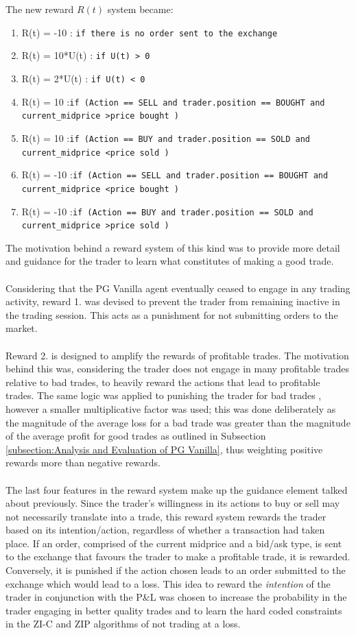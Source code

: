 \documentclass[ %
                    author={Ashwinder Khurana},
                supervisor={Prof Dave Cliff},
                    degree={MEng},
                     title={The Deeply Reinforced Trader},
                  subtitle={},
                      type={enterprise},
                      year={2020} ]{dissertation}
\begin{document}
{The new reward $R(t)$ system became: 
\begin{enumerate}
\item R(t) = -10 : \texttt{if there is no order sent to the exchange}
\item R(t) = 10*U(t) : \texttt{if U(t) > 0}
\item R(t) = 2*U(t) : \texttt{if U(t) < 0}
\item R(t) = 10 :\texttt{if (Action == SELL and trader.position == BOUGHT and current\_midprice \textgreater  price bought )}
\item R(t) = 10 :\texttt{if (Action == BUY and trader.position == SOLD and current\_midprice \textless  price sold )}
\item R(t) = -10 :\texttt{if (Action == SELL and trader.position == BOUGHT and current\_midprice \textless  price bought )}
\item R(t) = -10 :\texttt{if (Action == BUY and trader.position == SOLD and current\_midprice \textgreater  price sold )}
\end{enumerate}
\noindent
The motivation behind a reward system of this kind was to provide more detail and guidance for the trader to learn what constitutes of making a good trade. 
\\
\\
Considering that the PG Vanilla agent eventually ceased to engage in any trading activity, reward 1. was devised to prevent the trader from remaining inactive in the trading session. This acts as a punishment for not submitting orders to the market. 
\\
\\
Reward 2. is designed to amplify the rewards of profitable trades. The motivation behind this was, considering the trader does not engage in many profitable trades relative to bad trades, to heavily reward the actions that lead to profitable trades. The same logic was applied to punishing the trader for bad trades , however a smaller multiplicative factor was used; this was done deliberately as the magnitude of the average loss for a bad trade was greater than the magnitude of the average profit for good trades as outlined in Subsection \ref{subsection:Analysis and Evaluation of PG Vanilla}, thus weighting positive rewards more than negative rewards.
\\
\\
 The last four features in the reward system make up the guidance element talked about previously. Since the trader's willingness in its actions to buy or sell may not necessarily translate into a trade, this reward system rewards the trader based on its intention/action, regardless of whether a transaction had taken place. If an order, comprised of the current midprice and a bid/ask type, is sent to the exchange that favours the trader to make a profitable trade, it is rewarded. Conversely, it is punished if the action chosen leads to an order submitted to the exchange which would lead to a loss. This idea to reward the \textit{intention} of the trader in conjunction with the P\&L was chosen to increase the probability in the trader engaging in better quality trades and to learn the hard coded constraints in the ZI-C and ZIP algorithms of not trading at a loss.  
}
\end{document}
